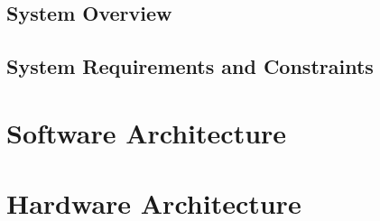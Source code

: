\subsection{System Overview}

\subsection{System Requirements and Constraints}

\section{Software Architecture}

\section{Hardware Architecture}
